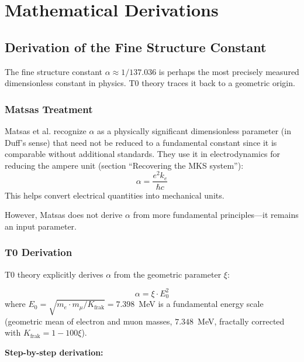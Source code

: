 	\section{Mathematical Derivations}
	
	\subsection{Derivation of the Fine Structure Constant}\label{sec:alpha_derivation}
	
	The fine structure constant $\alpha \approx 1/137.036$ is perhaps the most precisely measured dimensionless constant in physics. T0 theory traces it back to a geometric origin.
	
	\subsubsection{Matsas Treatment}
	
	Matsas et al. recognize $\alpha$ as a physically significant dimensionless parameter (in Duff's sense) that need not be reduced to a fundamental constant since it is comparable without additional standards. They use it in electrodynamics for reducing the ampere unit (section ``Recovering the MKS system''):
	\[
	\alpha = \frac{e^2 k_e}{\hbar c}
	\]
	This helps convert electrical quantities into mechanical units.
	
	However, Matsas does not derive $\alpha$ from more fundamental principles—it remains an input parameter.
	
	\subsubsection{T0 Derivation}
	
	T0 theory explicitly derives $\alpha$ from the geometric parameter $\xi$:
	
	\begin{keyresult}
		\[
		\alpha = \xi \cdot E_0^2
		\]
		where $E_0 = \sqrt{m_e \cdot m_\mu/K_{\text{frak}}} = 7.398$~MeV is a fundamental energy scale (geometric mean of electron and muon masses, $7.348$~MeV, fractally corrected with $K_{\text{frak}} = 1 - 100\xi$).
	\end{keyresult}
	
	\textbf{Step-by-step derivation:}
	

